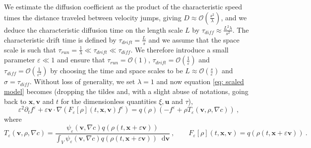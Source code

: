 \documentclass[review,onefignum,onetabnum]{siamart220329}
\newcommand*\diff{\mathop{}\!\mathrm{d}}
\begin{document}
We estimate the diffusion coefficient as the product of the characteristic speed times the distance traveled between velocity jumps, giving $D \approx \mathcal{O}(\frac{s^2}{\lambda})$, and we deduce the characteristic diffusion time on the length scale $L$ by $\tau_{diff} \approx \frac{L^2 \lambda}{s^2}$. The characteristic drift time is defined by $\tau_{drift} = \frac{L}{s}$ and we assume that the space scale is such that $\tau_{run} = \frac{1}{\lambda} \ll \tau_{drift} \ll \tau_{diff}$. We therefore introduce a small parameter $\varepsilon \ll 1$ and ensure that $\tau_{run} = \mathcal{O}(1)$, $\tau_{drift} = \mathcal{O}(\frac{1}{\varepsilon})$ and $\tau_{diff} = \mathcal{O}(\frac{1}{\varepsilon^2})$ by choosing the time and space scales to be $L \approx \mathcal{O}(\frac{s}{\varepsilon})$ and $\sigma = \tau_{diff}$. Without loss of generality, we set $\lambda = 1$ and now equation \cref{eq: scaled model} becomes (dropping the tildes {and, with a slight abuse of notations, going back to $\mathbf{x},\mathbf{v}$ and $t$ for the dimensionless quantities $\xi, \mathbf{u}$ and $\tau$),
\begin{equation}
    \varepsilon^2 \partial_t f^\varepsilon+\varepsilon\mathbf{v}\cdot \nabla(F_\varepsilon[\rho](t,\mathbf{x},\mathbf{v}) f^\varepsilon) = q(\rho)(-f^\varepsilon+\rho T_\varepsilon(\mathbf{v},\rho,\nabla c))\ , \label{eq: inital model with scaling}
\end{equation}
\noindent where
\begin{equation}\label{TepsFeps}
    T_\varepsilon(\mathbf{v},\rho,\nabla c)=\frac{\psi_\varepsilon(\mathbf{v},\nabla c) q(\rho(t,\mathbf{x}+\varepsilon \mathbf{v}))}{\displaystyle\int_{V}\psi_\varepsilon(\mathbf{v},\nabla c) q(\rho(t,\mathbf{x}+\varepsilon \mathbf{v})) \diff \mathbf{v}}\ ,\qquad
    F_\varepsilon[\rho](t,\mathbf{x},\mathbf{v}) = q(\rho(t,\mathbf{x}+\varepsilon \mathbf{v}))\ .
\end{equation}
} 
\end{document}

